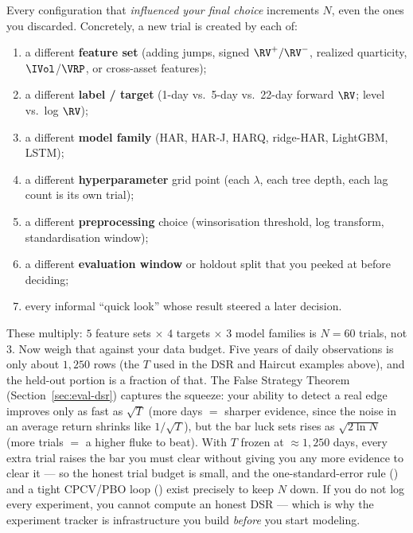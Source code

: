 \begin{keyidea}
Every configuration that \emph{influenced your final choice} increments $N$, even the ones you discarded. Concretely, a new trial is created by each of:
\begin{enumerate}[nosep]
  \item a different \textbf{feature set} (adding jumps, signed $\RV^{+}/\RV^{-}$, realized quarticity, $\IVol$/$\VRP$, or cross-asset features);
  \item a different \textbf{label / target} (1-day vs.\ 5-day vs.\ 22-day forward $\RV$; level vs.\ log $\RV$);
  \item a different \textbf{model family} (HAR, HAR-J, HARQ, ridge-HAR, LightGBM, LSTM);
  \item a different \textbf{hyperparameter} grid point (each $\lambda$, each tree depth, each lag count is its own trial);
  \item a different \textbf{preprocessing} choice (winsorisation threshold, log transform, standardisation window);
  \item a different \textbf{evaluation window} or holdout split that you peeked at before deciding;
  \item every informal ``quick look'' whose result steered a later decision.
\end{enumerate}
These multiply: $5$ feature sets $\times$ $4$ targets $\times$ $3$ model families is $N = 60$ trials, not $3$.
Now weigh that against your data budget. Five years of daily observations is only about $1{,}250$ rows (the $T$ used in the DSR and Haircut examples above), and the held-out portion is a fraction of that.
The False Strategy Theorem (Section~\ref{sec:eval-dsr}) captures the squeeze: your ability to detect a real edge improves only as fast as $\sqrt{T}$ (more days $=$ sharper evidence, since the noise in an average return shrinks like $1/\sqrt{T}$), but the bar luck sets rises as $\sqrt{2\ln N}$ (more trials $=$ a higher fluke to beat).
With $T$ frozen at $\approx 1{,}250$ days, every extra trial raises the bar you must clear without giving you any more evidence to clear it --- so the honest trial budget is small, and the one-standard-error rule () and a tight CPCV/PBO loop () exist precisely to keep $N$ down.
If you do not log every experiment, you cannot compute an honest DSR --- which is why the experiment tracker is infrastructure you build \emph{before} you start modeling.
\end{keyidea}

